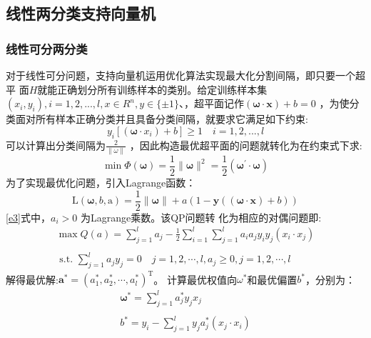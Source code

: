 \subsection{线性两分类支持向量机}
\subsubsection{线性可分两分类}
对于线性可分问题，支持向量机运用优化算法实现最大化分割间隔，即只要一个超平 面$H$就能正确划分所有训练样本的类别。给定训练样本集$(x_i,y_i),i=1,2,...,l,x\in R^n,y\in \{\pm1\}$、，超平面记作$(\boldsymbol{\omega}\cdot \boldsymbol{x})+b=0$ ，为使分类面对所有样本正确分类并且具备分类间隔，就要求它满足如下约束: 
\begin{equation}\label{e1}
    y_i[(\boldsymbol{\omega}\cdot x_i)+b]\ge 1\quad i=1,2,...,l
\end{equation}
可以计算出分类间隔为$\frac{2}{\parallel \omega\parallel}$ ，因此构造最优超平面的问题就转化为在约束式下求:
\begin{equation}\label{e2}
    \min \Phi(\boldsymbol{\omega})=\frac{1}{2}\|\boldsymbol{\omega}\|^{2}=\frac{1}{2}\left(\boldsymbol{\omega}^{\prime} \cdot \boldsymbol{\omega}\right)
\end{equation}
为了实现最优化问题，引入Lagrange函数：
\begin{equation}\label{e3}
    \mathrm{L}(\boldsymbol{\omega}, b, \mathrm{a})=\frac{1}{2}\|\boldsymbol{\omega}\|+a(1-\boldsymbol{y}((\boldsymbol{\omega} \cdot \boldsymbol{x})+b)) 
\end{equation}
\ref{e3}式中，$a_i>0$ 为Lagrange乘数。该QP问题转 化为相应的对偶问题即:
\begin{equation}
\begin{array}{l}
\max Q(a)=\sum_{j=1}^{l} a_{j}-\frac{1}{2} \sum_{i=1}^{l} \sum_{j=1}^{l} a_{i} a_{j} y_{i} y_{j}\left(x_{i} \cdot x_{j}\right) \\ \\
\text { s.t. } \sum_{j=1}^{l} a_{j} y_{j}=0 \quad j=1,2, \cdots, l, a_{j} \geqslant 0, j=1,2, \cdots, l
\end{array}
\end{equation}
解得最优解:$\boldsymbol{a}^{*}=\left(a_{1}^{*}, a_{2}^{*}, \cdots, a_{l}^{*}\right)^{\mathrm{T}}$。
计算最优权值向${\omega}^{*}$和最优偏置${b}^{*}$，分别为：
\begin{equation}\label{e5}
    \begin{array}{c}
\boldsymbol{\omega}^{*}=\sum_{j=1}^{l} a_{j}^{*} y_{j} x_{j} \\ \\
b^{*}=y_{i}-\sum_{j=1}^{l} y_{j} a_{j}^{*}\left(x_{j} \cdot x_{i}\right)
\end{array}
\end{equation}
